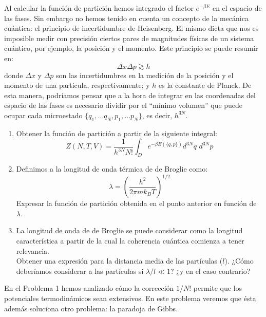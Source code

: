 \documentclass[a4paper,11pt]{article}
\newcounter{exercise}
\newcommand{\exercisetitle}[1]{
    \stepcounter{exercise}
    \vspace{1.5em}
    \noindent{
        \textbf{Problema \theexercise . #1}
        \vspace{0.5em}
    }
}
\begin{document}
Al calcular la función de partición hemos integrado el factor 
$e^{-\beta E}$ en el espacio de las fases. Sin embargo no hemos tenido 
en cuenta un concepto de la mecánica cuántica: el principio de 
incertidumbre de Heisenberg. El mismo dicta que nos es imposible medir 
con precisión ciertos pares de magnitudes físicas de un sistema 
cuántico, por ejemplo, la posición y el momento. Este principio se 
puede resumir en:
$$ \Delta x \Delta p \gtrsim  h$$
donde $\Delta x$ y $\Delta p$ son las incertidumbres en la medición de 
la posición y el momento de una particula, respectivamente; y $h$ es 
la constante de Planck.
De esta manera, podríamos pensar que a la hora de integrar en las 
coordenadas del espacio de las fases es necesario dividir por el 
``mínimo volumen'' que puede ocupar cada microestado 
$\{ q_1, \dots q_N, p_1, \dots p_N \}$, es decir, $h^{3N}$.

\begin{enumerate}[label=(\alph*),
                  leftmargin=2\parindent,
                  rightmargin=2\parindent]
      
    \item{Obtener la función de partición a partir de la siguiente 
          integral:
          $$
          Z(N, T, V) =
            \frac{1}{h^{3N} N!}
            \int_D e^{-\beta E(\{q, p\})} d^{3N}q \,\, d^{3N}p
          $$
          }

    \item{Definimos a la longitud de onda térmica de de Broglie como:
          $$ \lambda = \left( \frac{h^2}{2\pi m k_B T} \right)^{1/2} $$
          Expresar la función de partición obtenida en el punto 
          anterior en función de $\lambda$.
          }

    \item{La longitud de onda de de Broglie se puede considerar como la 
          longitud característica a partir de la cual la coherencia 
          cuántica comienza a tener relevancia.\\
          Obtener una expresión para la distancia media de las 
          partículas ($l$). ¿Cómo deberíamos considerar a las 
          partículas si $\lambda/l \ll 1$? ¿y en el caso contrario?
          }
          
\end{enumerate}


\exercisetitle{Paradoja de Gibbs}

En el Problema 1 hemos analizado cómo la corrección $1/N!$ permite 
que los potenciales termodinámicos sean extensivos. En este problema 
veremos que ésta además soluciona otro problema: la paradoja de Gibbs.
\end{document}
